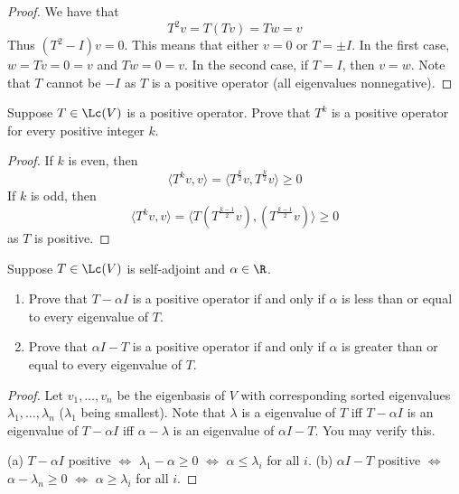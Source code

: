 \documentclass{extarticle}
\begin{document}
\begin{proof}
We have that
\[T^2 v = T(Tv) = Tw = v\]
Thus \((T^2 - I)v = 0\). This means that either \(v = 0\) or \(T = \pm I\). In the first case,
\(w = Tv = 0 = v\) and \(Tw = 0 = v\). In the second case, if \(T = I\), then \(v = w\). Note that
\(T\) cannot be \(-I\) as \(T\) is a positive operator (all eigenvalues nonnegative).
\end{proof}

\begin{problem}{12}
    Suppose \(T \in \Lc(V)\) is a positive operator. Prove that \(T^k\) is a positive operator
    for every positive integer \(k\).
\end{problem}

\begin{proof}
If \(k\) is even, then
\[\langle T^k v,v \rangle = \langle T^{\frac{k}{2}}v,T^{\frac{k}{2}}v \rangle \geq 0\]
If \(k\) is odd, then
\[\langle T^k v,v \rangle = \langle T(T^{\frac{k-1}{2}}v), (T^{\frac{k-1}{2}}v) \rangle \geq 0\]
as \(T\) is positive.
\end{proof}

\begin{problem}{13}
    Suppose \(T \in \Lc(V)\) is self-adjoint and \(\alpha \in \R\).
    \begin{enumerate}[label=(\alph*)]
        \item Prove that \(T - \alpha I\) is a positive operator if and only if \(\alpha\) is less
        than or equal to every eigenvalue of \(T\).
        \item Prove that \(\alpha I - T\) is a positive operator if and only if \(\alpha\) is
        greater than or equal to every eigenvalue of \(T\).
    \end{enumerate}
\end{problem}

\begin{proof}
Let \(v_1, \ldots, v_n\) be the eigenbasis of \(V\) with corresponding sorted eigenvalues \(\lambda_1,
\ldots, \lambda_n\) (\(\lambda_1\) being smallest). Note that \(\lambda\) is a eigenvalue of \(T\) iff \(T- \alpha I\) is
an eigenvalue of \(T - \alpha I\) iff \(\alpha - \lambda\) is an eigenvalue of \(\alpha I - T\). You
may verify this.

(a) \(T - \alpha I\) positive \(\Longleftrightarrow\) \(\lambda_1 - \alpha \geq 0\)
\(\Longleftrightarrow\) \(\alpha \leq \lambda_i\) for all \(i\).
(b) \(\alpha I  -T\) positive \(\Longleftrightarrow\) \(\alpha - \lambda_n \geq 0\)
\(\Longleftrightarrow\) \(\alpha \geq \lambda_i\) for all \(i\).
\end{proof}
\end{document}
